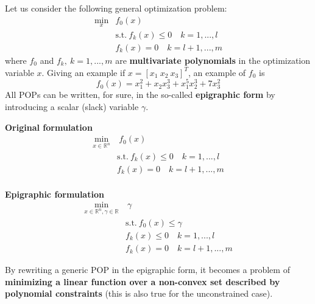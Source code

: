 \noindent 
Let us consider the following general optimization problem:
\begin{equation}
    \begin{aligned}
        \min_{x} &f_0(x)\\ 
        &\text{s.t.} \ f_k(x)\le{0} \quad k=1, ..., l\\
        &f_k(x)=0 \quad k=l+1,...,m
    \end{aligned}
\end{equation}
where $f_0$ and $f_k, \ k=1,...,m$ are \textbf{multivariate polynomials} in the optimization variable $x$. Giving an example if $x=[x_1\ x_2\ x_3]^T$, an example of $f_0$ is
\begin{equation*}
    f_0(x)=x_1^2+x_2{x_3^3}+x_1^5{x_2^3}+7{x_3^2}
\end{equation*}
All POPs can be written, for sure, in the so-called \textbf{epigraphic form} by introducing a scalar (slack) variable $\gamma$.

\begin{multicols}{2}
    \noindent
    \textbf{\color{red}Original formulation}
    \begin{equation}
        \begin{aligned}
            \min_{x\in\mathbb{R}^n} &\ f_0(x)\\ 
            &\text{s.t.} \ f_k(x)\le{0} \quad k=1, ..., l\\
            &f_k(x)=0 \quad k=l+1,...,m
        \end{aligned}
    \end{equation}
    \newcolumn\\
    \textbf{\color{red}Epigraphic formulation}
    \begin{equation}
        \begin{aligned}
            \min_{x\in\mathbb{R}^n, \gamma \in \mathbb{R}} &\ \gamma\\ 
            &\text{s.t.} \ f_0(x)\le\gamma\\
            &f_k(x)\le{0} \quad k=1, ..., l\\
            &f_k(x)=0 \quad k=l+1,...,m
        \end{aligned}
    \end{equation}
\end{multicols}
\noindent
By rewriting a generic POP in the epigraphic form, it becomes a problem of \textbf{minimizing a linear function over a non-convex set described by polynomial constraints} (this is also true  for the unconstrained case).


